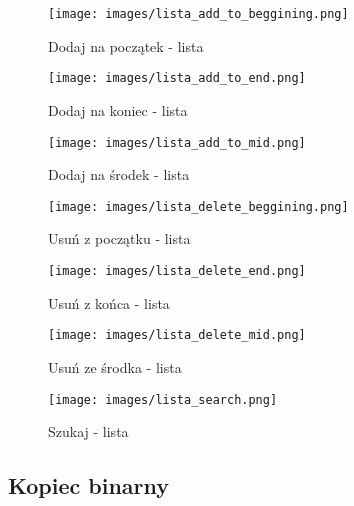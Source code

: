\documentclass{article}
\begin{document}
\begin{figure}[h]
    \centering
    \texttt{[image: images/lista\_add\_to\_beggining.png]}
    \caption{Dodaj na początek - lista}
\end{figure}
\begin{figure}[H]
    \centering
    \texttt{[image: images/lista\_add\_to\_end.png]}
    \caption{Dodaj na koniec - lista}
\end{figure}
\begin{figure}[H]
    \centering
    \texttt{[image: images/lista\_add\_to\_mid.png]}
    \caption{Dodaj na środek - lista}
\end{figure}
\begin{figure}[H]
    \centering
    \texttt{[image: images/lista\_delete\_beggining.png]}
    \caption{Usuń z początku - lista}
\end{figure}
\begin{figure}[H]
    \centering
    \texttt{[image: images/lista\_delete\_end.png]}
    \caption{Usuń z końca - lista}
\end{figure}
\begin{figure}[H]
    \centering
    \texttt{[image: images/lista\_delete\_mid.png]}
    \caption{Usuń ze środka - lista}
\end{figure}
\begin{figure}[H]
    \centering
    \texttt{[image: images/lista\_search.png]}
    \caption{Szukaj - lista}
\end{figure}
\clearpage
\subsection{Kopiec binarny}
\end{document}
